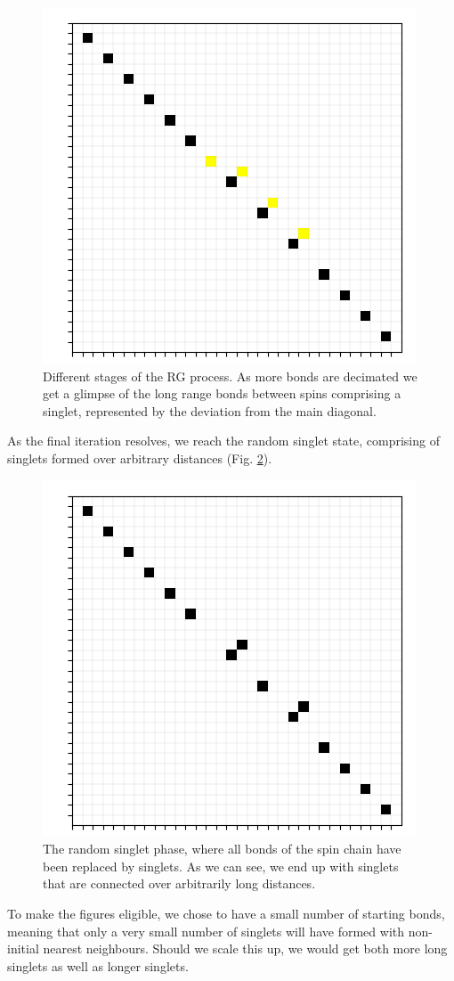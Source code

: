 \documentclass[../numerical,,../../main.tex]{subfiles}
\begin{document}
\begin{figure}[H]
    \begin{minipage}[]{.3\textwidth}
    \includegraphics[width=\textwidth]{Chapter5/Figures/RG/midrg13.png}
    \end{minipage}
    \caption{Different stages of the RG process. As more bonds are decimated we get a glimpse of the long range bonds between spins comprising a singlet, represented by the deviation from the main diagonal.}
    \label{fig:rgsteps}
\end{figure}

As the final iteration resolves, we reach the random singlet state, comprising of singlets formed over arbitrary distances (Fig. \ref{fig:randsingl}).
\begin{figure}[h!]
    \centering
    \includegraphics[scale=0.3]{Chapter5/Figures/RG/singlet-phase.png}
    \caption{The random singlet phase, where all bonds of the spin chain have been replaced by singlets. As we can see, we end up with singlets that are connected over arbitrarily long distances.}
    \label{fig:randsingl}
\end{figure}

To make the figures eligible, we chose to have a small number of starting bonds, meaning that only a very small number of singlets will have formed with non-initial nearest neighbours. Should we scale this up, we would get both more long singlets as well as longer singlets.\\
\end{document}
